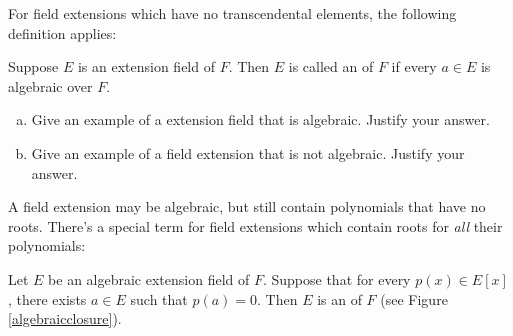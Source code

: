 For field extensions which have no transcendental elements, the following definition applies:

\begin{defn}\label{def:algfieldextension}  
Suppose $E$ is an extension field of $F$. Then $E$ is called an  of $F$ if every $a\in E$ is algebraic over $F$. %
 \end{defn}

\begin{exercise}{}
\begin{enumerate}[(a)]
\item
Give an example of a extension field that is algebraic. Justify your answer.
\item
Give an example of a field extension that is not algebraic. Justify your answer.
\end{enumerate}
\end{exercise}

A field extension may be algebraic, but still contain polynomials that have no roots. There's a special term for field extensions which contain roots for \emph{all} their polynomials:


\begin{defn}\label{def:algclosure}  
Let $E$ be an algebraic extension field of $F$. Suppose that for every $p(x) \in E[x]$, there exists $a \in E$ such that $p(a)=0$.  Then  $E$ is  an  of $F$ (see Figure \ref{algebraicclosure}).
\end{defn}

